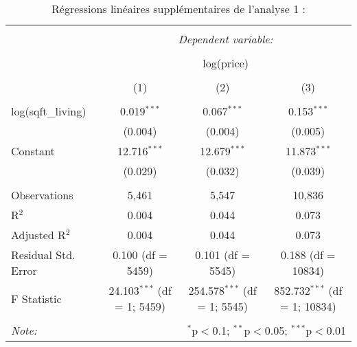 \documentclass[
  11pt,
  french,
]{article}
\begin{document}
\begin{table}[!htbp] \centering 
  \caption{Régressions linéaires supplémentaires de l'analyse 1 :} 
  \label{} 
\small 
\begin{tabular}{@{\extracolsep{1pt}}lccc} 
\\[-1.8ex]\hline 
\hline \\[-1.8ex] 
 & \multicolumn{3}{c}{\textit{Dependent variable:}} \\ 
\cline{2-4} 
\\[-1.8ex] & \multicolumn{3}{c}{log(price)} \\ 
\\[-1.8ex] & (1) & (2) & (3)\\ 
\hline \\[-1.8ex] 
 log(sqft\_living) & 0.019$^{***}$ & 0.067$^{***}$ & 0.153$^{***}$ \\ 
  & (0.004) & (0.004) & (0.005) \\ 
  Constant & 12.716$^{***}$ & 12.679$^{***}$ & 11.873$^{***}$ \\ 
  & (0.029) & (0.032) & (0.039) \\ 
 \hline \\[-1.8ex] 
Observations & 5,461 & 5,547 & 10,836 \\ 
R$^{2}$ & 0.004 & 0.044 & 0.073 \\ 
Adjusted R$^{2}$ & 0.004 & 0.044 & 0.073 \\ 
Residual Std. Error & 0.100 (df = 5459) & 0.101 (df = 5545) & 0.188 (df = 10834) \\ 
F Statistic & 24.103$^{***}$ (df = 1; 5459) & 254.578$^{***}$ (df = 1; 5545) & 852.732$^{***}$ (df = 1; 10834) \\ 
\hline 
\hline \\[-1.8ex] 
\textit{Note:}  & \multicolumn{3}{r}{$^{*}$p$<$0.1; $^{**}$p$<$0.05; $^{***}$p$<$0.01} \\ 
\end{tabular} 
\end{table}
\end{document}
